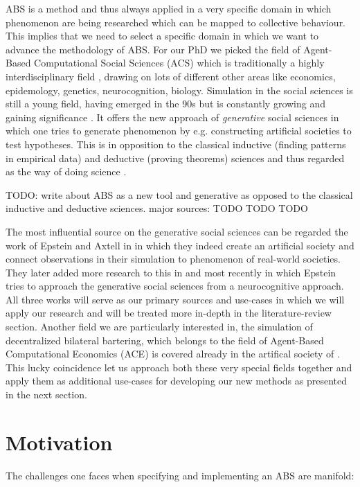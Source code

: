 ABS is a method and thus always applied in a very specific domain in which phenomenon are being researched which can be mapped to collective behaviour. This implies that we need to select a specific domain in which we want to advance the methodology of ABS. For our PhD we picked the field of Agent-Based Computational Social Sciences (ACS) which is traditionally a highly interdisciplinary field \cite{axelrod_chapter_2006}, drawing on lots of different other areas like economics, epidemology, genetics, neurocognition, biology. Simulation in the social sciences is still a young field, having emerged in the 90s but is constantly growing and gaining significance \cite{axelrod_advancing_1997}. It offers the new approach of \textit{generative} social sciences in which one tries to generate phenomenon by e.g. constructing artificial societies to test hypotheses. This is in opposition to the classical inductive (finding patterns in empirical data) and deductive (proving theorems) sciences and thus regarded as the way of doing science \cite{axelrod_advancing_1997}. 

TODO: write about ABS as a new tool and  generative as opposed to the classical inductive and deductive sciences. major sources: 
TODO \cite{axtell_aligning_1996}
TODO \cite{epstein_chapter_2006}
TODO \cite{epstein_generative_2012}

The most influential source on the generative social sciences can be regarded the work of Epstein and Axtell in \cite{epstein_growing_1996} in which they indeed create an artificial society and connect observations in their simulation to phenomenon of real-world societies. They later added more research to this in \cite{epstein_generative_2012} and most recently \cite{epstein_agent_zero:_2014} in which Epstein tries to approach the generative social sciences from a neurocognitive approach. All three works will serve as our primary sources and use-cases in which we will apply our research and will be treated more in-depth in the literature-review section.
Another field we are particularly interested in, the simulation of decentralized bilateral bartering, which belongs to the field of Agent-Based Computational Economics (ACE) \cite{tesfatsion_agent-based_2006} is covered already in the artifical society of \cite{epstein_growing_1996}. This lucky coincidence let us approach both these very special fields together and apply them as additional use-cases for developing our new methods as presented in the next section.

\section{Motivation}
The challenges one faces when specifying and implementing an ABS are manifold:

